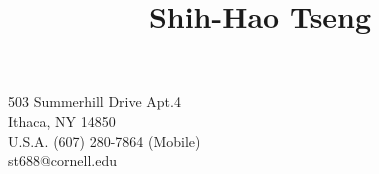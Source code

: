 \title{Shih-Hao Tseng}{
503 Summerhill Drive Apt.4\\
Ithaca, NY 14850 \\
U.S.A.
}{
(607) 280-7864 (Mobile) \\
st688@cornell.edu
}